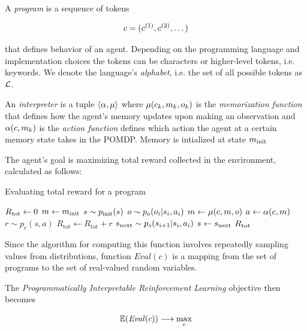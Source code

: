 A \emph{program} is a sequence of tokens

\begin{equation}
    c=(c^{(1)},c^{(2)},\dots)
\end{equation}

that defines behavior of an agent.
Depending on the programming language and implementation choices the tokens can be characters or higher-level tokens, i.e. keywords.
We denote the language's \emph{alphabet}, i.e. the set of all possible tokens as $\mathcal{L}$.

An \emph{interpreter} is a tuple $\langle \alpha,\mu \rangle$ where $\mu(c_k,m_k,o_k)$ is the \emph{memorization function} that defines how the agent's memory updates upon making an observation and $\alpha(c, m_k)$ is the \emph{action function} defines which action the agent at a certain memory state takes in the POMDP.
Memory is intialized at state $m_\text{init}$

The agent's goal is maximizing total reward collected in the environment, calculated as follows:

\begin{algorithm}[H]
\begin{algorithmic}[1]
\caption{Evaluating total reward for a program}
\State $R_\text{tot} \gets 0$
\State $m \gets m_\text{init}$
\State $s \sim p_\text{init}(s)$
\While{$\rlstate \in \rlnontermstates$}
\State $o \sim p_o(o_i | s_i, a_i)$
\State $m \gets \mu(c,m,o)$
\State $a \gets \alpha(c, m)$ 
\State $r \sim p_r(s,a)$
\State $R_\text{tot} \gets R_\text{tot} + r$
\State $s_\text{next} \sim p_s(s_{i+1} | s_i, a_i)$
\State $s\gets s_\text{next}$
\EndWhile
\State \Return $R_\text{tot}$
\EndFunction
\end{algorithmic}
\end{algorithm}

Since the algorithm for computing this function involves repeatedly sampling values from distributions, function $\mathit{Eval}(c)$ is a mapping from the set of programs to the set of real-valued random variables.

The \emph{Programmatically Interpretable Reinforcement Learning} objective then becomes

\begin{equation}
    \mathbb{E}(\mathit{Eval}(c)) \longrightarrow \max_{c}
    \label{eq:pirlgoal}
\end{equation}

